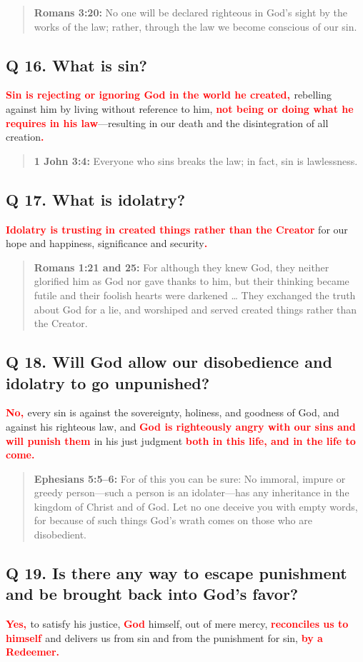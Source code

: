 \documentclass[]{memoir}
\newcommand\Children[1]{\textbf{\textcolor{red}{#1}}}
\newcommand\Quote[2]{\begin{quote}{\textbf{#1:}{ #2}}\end{quote}}
\begin{document}
\Quote{Romans 3:20}{No one will be declared righteous in God's sight by the works of the law; rather, through the law we become conscious of our sin.}

\subsection{Q 16. What is sin?}
\Children{Sin is rejecting or ignoring God in the world he created, }rebelling against him by living without reference to him, \Children{not being or doing what he requires in his law}\thinspace{}---\thinspace{}resulting in our death and the disintegration of all creation\Children{.}

\Quote{1 John 3:4}{Everyone who sins breaks the law; in fact, sin is lawlessness.}

\subsection{Q 17. What is idolatry?}
\Children{Idolatry is trusting in created things rather than the Creator} for our hope and happiness, significance and security\Children{.}

\Quote{Romans 1:21 and 25\index[rom]{01:25@1:25}}{For although they knew God, they neither glorified him as God nor gave thanks to him, but their thinking became futile and their foolish hearts were darkened {\dots} They exchanged the truth about God for a lie, and worshiped and served created things rather than the Creator.}

\subsection{Q 18. Will God allow our disobedience and idolatry to go unpunished?}
\Children{No, }every sin is against the sovereignty, holiness, and goodness of God, and against his righteous law, and \Children{God is righteously angry with our sins and will punish them }in his just judgment \Children{both in this life, and in the life to come.}

\Quote{Ephesians 5:5--6}{For of this you can be sure: No immoral, impure or greedy person\thinspace{}---\thinspace{}such a person is an idolater\thinspace{}---\thinspace{}has any inheritance in the kingdom of Christ and of God. Let no one deceive you with empty words, for because of such things God's wrath comes on those who are disobedient.}

\subsection{Q 19. Is there any way to escape punishment and be brought back into God's favor?}
\Children{Yes, }to satisfy his justice, \Children{God} himself, out of mere mercy, \Children{reconciles us to himself }and delivers us from sin and from the punishment for sin, \Children{by a Redeemer.}
\end{document}
